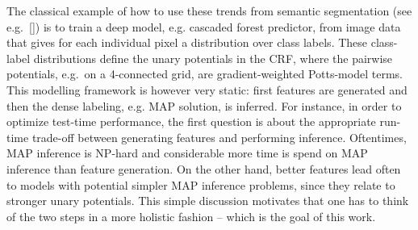 \documentclass[10pt,twocolumn,letterpaper]{article}
\begin{document}
The classical example of how to use these trends from semantic segmentation (see e.g.\ []) is to train a deep model, e.g. cascaded forest predictor, from image data that gives for each individual pixel a distribution over class labels. These class-label distributions define the unary potentials in the CRF, where the pairwise potentials, e.g.\ on a 4-connected grid, are gradient-weighted Potts-model terms. This modelling framework is however very static: first features are generated and then the dense labeling, e.g. MAP solution, is inferred. For instance, in order to optimize test-time performance, the first question is about the appropriate run-time trade-off between generating features and performing inference. Oftentimes, MAP inference is NP-hard and considerable more time is spend on MAP inference than feature generation. On the other hand, better features lead often to models with potential simpler MAP inference problems, since they relate to stronger unary potentials. This simple discussion motivates that one has to think of the two steps in a more holistic fashion – which is the goal of this work.
\end{document}
